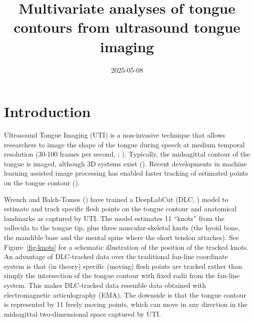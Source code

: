 \documentclass[
  man,
  longtable,
  nolmodern,
  notxfonts,
  notimes,
  colorlinks=true,linkcolor=blue,citecolor=blue,urlcolor=blue]{apa7}
\title{Multivariate analyses of tongue contours from ultrasound tongue
imaging}
\affiliation{
{University of Edinburgh}}
\date{2025-05-08}
\begin{document}
\maketitle


\setcounter{secnumdepth}{-\maxdimen} %

\setlength\LTleft{0pt}


\section{Introduction}\label{introduction}

Ultrasound Tongue Imaging (UTI) is a non-invasive technique that allows
researchers to image the shape of the tongue during speech at medium
temporal resolution (30-100 frames per second,
;
). Typically, the midsagittal
contour of the tongue is imaged, although 3D systems exist
(). Recent developments in
machine learning assisted image processing has enabled faster tracking
of estimated points on the tongue contour
().

Wrench and Balch-Tomes () have trained a
DeepLabCut (DLC, ) model
to estimate and track specific flesh points on the tongue contour and
anatomical landmarks as captured by UTI. The model estimates 11
``knots'' from the vallecula to the tongue tip, plus three
muscular-skeletal knots (the hyoid bone, the mandible base and the
mental spine where the short tendon attaches). See
Figure~\ref{fig-knots} for a schematic illustration of the position of
the tracked knots. An advantage of DLC-tracked data over the traditional
fan-line coordinate system is that (in theory) specific (moving) flesh
points are tracked rather than simply the intersection of the tongue
contour with fixed radii from the fan-line system. This makes
DLC-tracked data resemble data obtained with electromagnetic
articulography (EMA). The downside is that the tongue contour is
represented by 11 freely moving points, which can move in any direction
in the midsagittal two-dimensional space captured by UTI.
\end{document}
